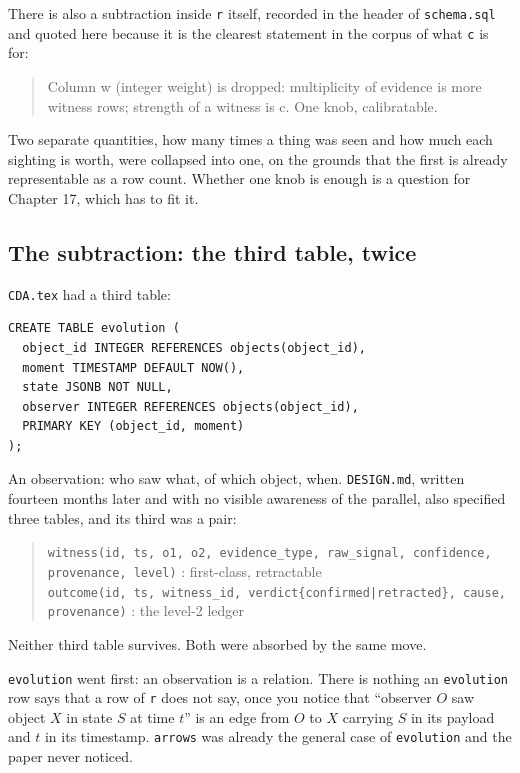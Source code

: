 There is also a subtraction inside \texttt{r} itself, recorded in the header of \texttt{schema.sql} and quoted here because it is the clearest statement in the corpus of what \texttt{c} is for:

\begin{quote}
Column w (integer weight) is dropped: multiplicity of evidence is more witness rows; strength of a witness is c. One knob, calibratable.
\end{quote}

Two separate quantities, how many times a thing was seen and how much each sighting is worth, were collapsed into one, on the grounds that the first is already representable as a row count. Whether one knob is enough is a question for Chapter 17, which has to fit it.

\subsection{The subtraction: the third table, twice}

\texttt{CDA.tex} had a third table:

\begin{lstlisting}
CREATE TABLE evolution (
  object_id INTEGER REFERENCES objects(object_id),
  moment TIMESTAMP DEFAULT NOW(),
  state JSONB NOT NULL,
  observer INTEGER REFERENCES objects(object_id),
  PRIMARY KEY (object_id, moment)
);
\end{lstlisting}

An observation: who saw what, of which object, when. \texttt{DESIGN.md}, written fourteen months later and with no visible awareness of the parallel, also specified three tables, and its third was a pair:

\begin{quote}
\texttt{witness(id, ts, o1, o2, evidence\_type, raw\_signal, confidence, provenance, level)} : first-class, retractable \\
\texttt{outcome(id, ts, witness\_id, verdict\{confirmed|retracted\}, cause, provenance)} : the level-2 ledger
\end{quote}

Neither third table survives. Both were absorbed by the same move.

\texttt{evolution} went first: an observation is a relation. There is nothing an \texttt{evolution} row says that a row of \texttt{r} does not say, once you notice that ``observer $O$ saw object $X$ in state $S$ at time $t$'' is an edge from $O$ to $X$ carrying $S$ in its payload and $t$ in its timestamp. \texttt{arrows} was already the general case of \texttt{evolution} and the paper never noticed.

